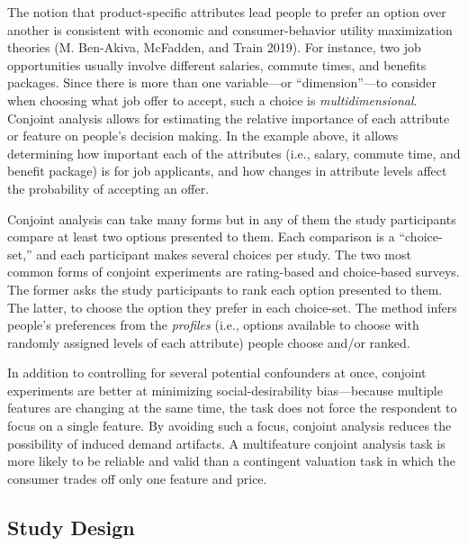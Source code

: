 \documentclass[
  12pt,
]{article}
\begin{document}
The notion that product-specific attributes lead people to prefer an option over another is consistent with economic and consumer-behavior utility maximization theories (M. Ben-Akiva, McFadden, and Train 2019). For instance, two job opportunities usually involve different salaries, commute times, and benefits packages. Since there is more than one variable---or ``dimension''---to consider when choosing what job offer to accept, such a choice is \emph{multidimensional}. Conjoint analysis allows for estimating the relative importance of each attribute or feature on people's decision making. In the example above, it allows determining how important each of the attributes (i.e., salary, commute time, and benefit package) is for job applicants, and how changes in attribute levels affect the probability of accepting an offer.

Conjoint analysis can take many forms but in any of them the study participants compare at least two options presented to them. Each comparison is a ``choice-set,'' and each participant makes several choices per study. The two most common forms of conjoint experiments are rating-based and choice-based surveys. The former asks the study participants to rank each option presented to them. The latter, to choose the option they prefer in each choice-set. The method infers people's preferences from the \emph{profiles} (i.e., options available to choose with randomly assigned levels of each attribute) people choose and/or ranked.

In addition to controlling for several potential confounders at once, conjoint experiments are better at minimizing social-desirability bias---because multiple features are changing at the same time, the task does not force the respondent to focus on a single feature. By avoiding such a focus, conjoint analysis reduces the possibility of induced demand artifacts. A multifeature conjoint analysis task is more likely to be reliable and valid than a contingent valuation task in which the consumer trades off only one feature and price.

\hypertarget{study-design}{%
\subsection{Study Design}\label{study-design}}
\end{document}

